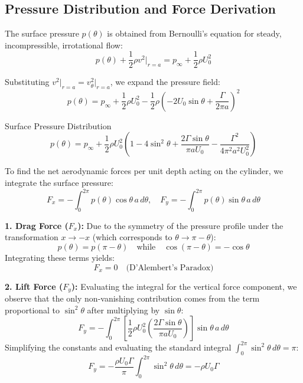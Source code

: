 \subsection{Pressure Distribution and Force Derivation}

The surface pressure $p(\theta)$ is obtained from Bernoulli's equation for steady, incompressible, irrotational flow:
\begin{equation}
p(\theta) + \frac{1}{2}\rho v^2\big|_{r=a} = p_\infty + \frac{1}{2}\rho U_0^2
\end{equation}

Substituting $v^2\big|_{r=a} = v_\theta^2\big|_{r=a}$, we expand the pressure field:
\begin{equation}
p(\theta) = p_\infty + \frac{1}{2}\rho U_0^2 - \frac{1}{2}\rho \left( -2U_0 \sin\theta + \frac{\Gamma}{2\pi a} \right)^2
\end{equation}

\begin{eqbox}{Surface Pressure Distribution}
\label{eq:surface_pressure}
\begin{equation}
p(\theta) = p_\infty + \frac{1}{2}\rho U_0^2 \left( 1 - 4\sin^2\theta + \frac{2\Gamma\sin\theta}{\pi a U_0} - \frac{\Gamma^2}{4\pi^2 a^2 U_0^2} \right)
\end{equation}
\end{eqbox}

To find the net aerodynamic forces per unit depth acting on the cylinder, we integrate the surface pressure:
\begin{equation}
F_x = -\int_0^{2\pi} p(\theta) \cos\theta \, a \, d\theta, \quad F_y = -\int_0^{2\pi} p(\theta) \sin\theta \, a \, d\theta
\end{equation}

\textbf{1. Drag Force ($F_x$):}
Due to the symmetry of the pressure profile under the transformation $x \to -x$ (which corresponds to $\theta \to \pi - \theta$):
\begin{equation}
p(\theta) = p(\pi - \theta) \quad \text{while} \quad \cos(\pi - \theta) = -\cos\theta
\end{equation}
Integrating these terms yields:
\begin{equation}
F_x = 0 \quad \text{(D'Alembert's Paradox)}
\end{equation}

\textbf{2. Lift Force ($F_y$):}
Evaluating the integral for the vertical force component, we observe that the only non-vanishing contribution comes from the term proportional to $\sin^2\theta$ after multiplying by $\sin\theta$:
\begin{equation}
F_y = -\int_0^{2\pi} \left[ \frac{1}{2}\rho U_0^2 \left( \frac{2\Gamma \sin\theta}{\pi a U_0} \right) \right] \sin\theta \, a \, d\theta
\end{equation}
Simplifying the constants and evaluating the standard integral $\int_0^{2\pi} \sin^2\theta \, d\theta = \pi$:
\begin{equation}
F_y = -\frac{\rho U_0 \Gamma}{\pi} \int_0^{2\pi} \sin^2\theta \, d\theta = -\rho U_0 \Gamma
\end{equation}

